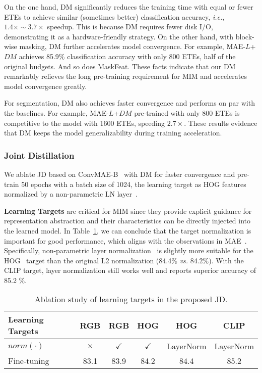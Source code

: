 \documentclass[lettersize,journal]{IEEEtran}
\begin{document}
On the one hand, DM significantly reduces the training time with equal or fewer ETEs to achieve similar (sometimes better) classification accuracy, \textit{i.e.}, $1.4\times \sim 3.7\times$ speedup. This is because DM requires fewer disk I/O, demonstrating it as a hardware-friendly strategy. 
On the other hand, with block-wise masking, DM further accelerates model convergence. 
For example, MAE-$L$+$DM$ achieves 85.9$\%$ classification accuracy with only 800 ETEs, half of the original budgets. And so does MaskFeat. These facts indicate that our DM remarkably relieves the long pre-training requirement for MIM and accelerates model convergence greatly.

For segmentation, DM also achieves faster convergence and performs on par with the baselines. 
For example, MAE-$L$+$DM$ pre-trained with only 800 ETEs is competitive to the model with 1600 ETEs, speeding $2.7\times$. These results evidence that DM keeps the model generalizability during training acceleration.


\subsubsection{\textbf{Joint Distillation}}
\label{ablate:jd}
We ablate JD based on ConvMAE-B~\cite{2022arXiv220503892G} with DM for faster convergence and pre-train 50 epochs with a batch size of 1024, the learning target as HOG features~\cite{Dalal2005HistogramsOO} normalized by a non-parametric LN layer~\cite{2016arXiv160706450L}. 

\textbf{Learning Targets} are critical for MIM since they provide explicit guidance for representation abstraction and their characteristics can be directly injected into the learned model.
In Table~\ref{tab:vdb-model}, we can conclude that the target normalization is important for good performance, which aligns with the observations in MAE~\cite{2021arXiv211106377H}. Specifically, non-parametric layer normalization~\cite{2016arXiv160706450L} is slightly more suitable for the HOG~\cite{Dalal2005HistogramsOO} target than the original L2 normalization (84.4$\%$ \textit{vs.} 84.2$\%$). With the CLIP target, layer normalization still works well and reports superior accuracy of 85.2 $\%$.

\begin{table}[!t]
    \centering
    \caption{Ablation study of learning targets in the proposed JD.} 
    \label{tab:vdb-model}
    \begin{tabular}{lccccc}
      \toprule
      Learning Targets & RGB & RGB & HOG & HOG & CLIP\\
      \midrule
      $norm(\cdot)$ & $\times$ & $\checkmark$ & $\checkmark$ & LayerNorm & LayerNorm \\
      Fine-tuning & 83.1 & 83.9 & 84.2 & 84.4 & 85.2 \\
      \bottomrule
    \end{tabular}
\end{table}
\end{document}
